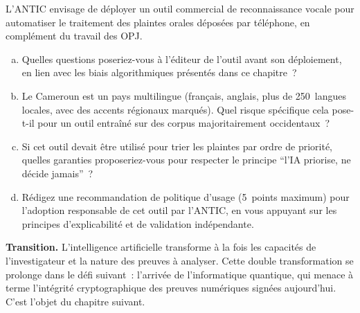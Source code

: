 \begin{boxexo}[title={\ding{45}\quad Exercice~22.3 --- IA et biais en contexte camerounais \niveauexpert}]
L'ANTIC envisage de déployer un outil commercial de reconnaissance
vocale pour automatiser le traitement des plaintes orales déposées
par téléphone, en complément du travail des OPJ.
\begin{enumerate}[(a)]
    \item Quelles questions poseriez-vous à l'éditeur de l'outil
          avant son déploiement, en lien avec les biais algorithmiques
          présentés dans ce chapitre~?
    \item Le Cameroun est un pays multilingue (français, anglais,
          plus de 250~langues locales, avec des accents régionaux
          marqués). Quel risque spécifique cela pose-t-il pour
          un outil entraîné sur des corpus majoritairement
          occidentaux~?
    \item Si cet outil devait être utilisé pour trier les plaintes
          par ordre de priorité, quelles garanties proposeriez-vous
          pour respecter le principe ``l'IA priorise, ne décide
          jamais''~?
    \item Rédigez une recommandation de politique d'usage (5~points
          maximum) pour l'adoption responsable de cet outil par
          l'ANTIC, en vous appuyant sur les principes
          d'explicabilité et de validation indépendante.
\end{enumerate}
\end{boxexo}

\bigskip

\begin{boxinfo}
\textbf{Transition.} L'intelligence artificielle transforme à la
fois les capacités de l'investigateur et la nature des preuves
à analyser. Cette double transformation se prolonge dans le défi
suivant~: l'arrivée de l'informatique quantique, qui menace
à terme l'intégrité cryptographique des preuves numériques
signées aujourd'hui. C'est l'objet du chapitre suivant.
\end{boxinfo}